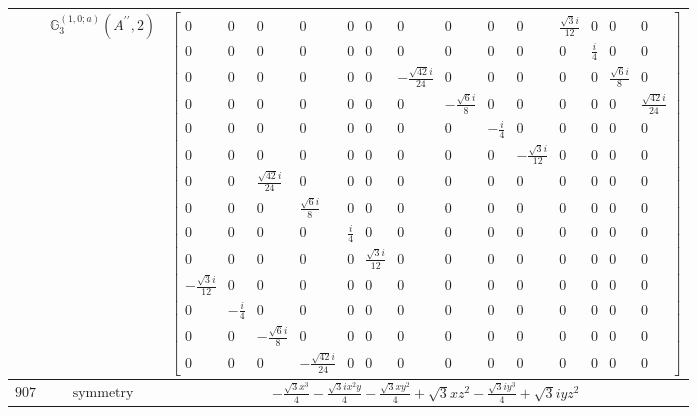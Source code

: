 \documentclass[fleqn,8pt,landscape]{jsarticle}
\begin{document}
\begin{longtable}{ccc}
$  $ & $ \mathbb{G}_{3}^{(1,0;a)}(A^{\prime\prime},2) $ & $ \begin{bmatrix} 0 & 0 & 0 & 0 & 0 & 0 & 0 & 0 & 0 & 0 & \frac{\sqrt{3} i}{12} & 0 & 0 & 0 \\ 0 & 0 & 0 & 0 & 0 & 0 & 0 & 0 & 0 & 0 & 0 & \frac{i}{4} & 0 & 0 \\ 0 & 0 & 0 & 0 & 0 & 0 & - \frac{\sqrt{42} i}{24} & 0 & 0 & 0 & 0 & 0 & \frac{\sqrt{6} i}{8} & 0 \\ 0 & 0 & 0 & 0 & 0 & 0 & 0 & - \frac{\sqrt{6} i}{8} & 0 & 0 & 0 & 0 & 0 & \frac{\sqrt{42} i}{24} \\ 0 & 0 & 0 & 0 & 0 & 0 & 0 & 0 & - \frac{i}{4} & 0 & 0 & 0 & 0 & 0 \\ 0 & 0 & 0 & 0 & 0 & 0 & 0 & 0 & 0 & - \frac{\sqrt{3} i}{12} & 0 & 0 & 0 & 0 \\ 0 & 0 & \frac{\sqrt{42} i}{24} & 0 & 0 & 0 & 0 & 0 & 0 & 0 & 0 & 0 & 0 & 0 \\ 0 & 0 & 0 & \frac{\sqrt{6} i}{8} & 0 & 0 & 0 & 0 & 0 & 0 & 0 & 0 & 0 & 0 \\ 0 & 0 & 0 & 0 & \frac{i}{4} & 0 & 0 & 0 & 0 & 0 & 0 & 0 & 0 & 0 \\ 0 & 0 & 0 & 0 & 0 & \frac{\sqrt{3} i}{12} & 0 & 0 & 0 & 0 & 0 & 0 & 0 & 0 \\ - \frac{\sqrt{3} i}{12} & 0 & 0 & 0 & 0 & 0 & 0 & 0 & 0 & 0 & 0 & 0 & 0 & 0 \\ 0 & - \frac{i}{4} & 0 & 0 & 0 & 0 & 0 & 0 & 0 & 0 & 0 & 0 & 0 & 0 \\ 0 & 0 & - \frac{\sqrt{6} i}{8} & 0 & 0 & 0 & 0 & 0 & 0 & 0 & 0 & 0 & 0 & 0 \\ 0 & 0 & 0 & - \frac{\sqrt{42} i}{24} & 0 & 0 & 0 & 0 & 0 & 0 & 0 & 0 & 0 & 0 \end{bmatrix} $ \\ \hline
$ 907 $ & $ \text{symmetry} $ & $ - \frac{\sqrt{3} x^{3}}{4} - \frac{\sqrt{3} i x^{2} y}{4} - \frac{\sqrt{3} x y^{2}}{4} + \sqrt{3} x z^{2} - \frac{\sqrt{3} i y^{3}}{4} + \sqrt{3} i y z^{2} $ \\

\end{longtable}
\end{document}
